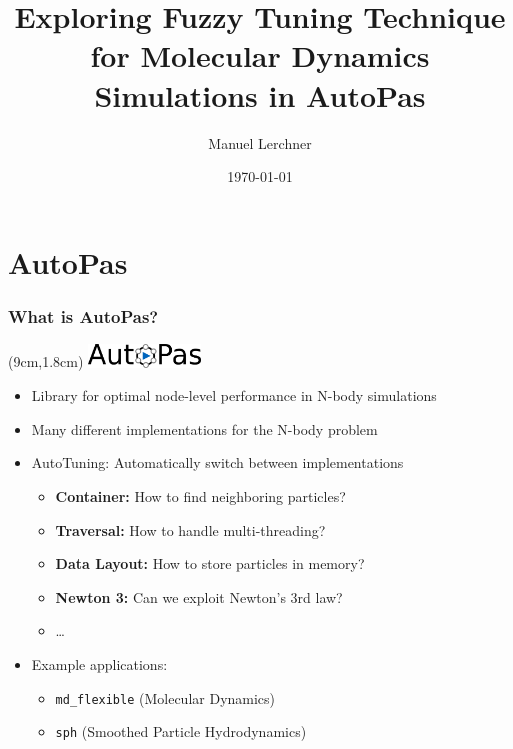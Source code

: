 \documentclass[
	10pt,
	t		%
]{beamer}
\title{Exploring Fuzzy Tuning Technique for Molecular Dynamics Simulations in AutoPas}
\author{Manuel Lerchner}
\date{\today}
\begin{document}
\maketitle


\section{AutoPas}
\begin{frame}
	\frametitle{What is AutoPas?}

	\begin{textblock*}{5cm}(9cm,1.8cm)
		\includegraphics[width=3cm]{figures/AutoPasLogo}
	\end{textblock*}


	\begin{itemize}
		\item Library for optimal node-level performance in N-body simulations
		\item Many different implementations for the N-body problem
		\item AutoTuning: Automatically switch between implementations
		      \begin{itemize}
			      \item \textbf{Container:} How to find neighboring particles?
			      \item \textbf{Traversal:} How to handle multi-threading?
			      \item \textbf{Data Layout:} How to store particles in memory?
			      \item \textbf{Newton 3:} Can we exploit Newton's 3rd law?
			      \item \dots
		      \end{itemize}
		\item Example applications:
		      \begin{itemize}
			      \item \texttt{md\_flexible} (Molecular Dynamics)
			      \item \texttt{sph} (Smoothed Particle Hydrodynamics)
		      \end{itemize}
	\end{itemize}
\end{frame}
\end{document}
